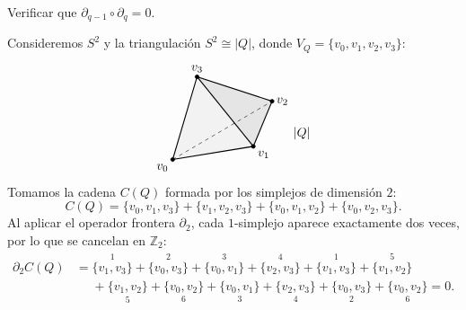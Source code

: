 \begin{ejercicio}
Verificar que ${\partial_{q-1} \circ \partial_q = 0}$.
\end{ejercicio}
\begin{ejemplo}
Consideremos $S^2$ y la triangulación $S^2 \cong |Q|$, donde $V_Q = \{v_0, v_1, v_2, v_3\}$:
\[
\begin{tikzpicture}[baseline=(current bounding box.center), scale=1.05]
    \coordinate (V0) at (0, 0);
    \coordinate (V1) at (2.15, 0.35);
    \coordinate (V2) at (2.65, 1.55);
    \coordinate (V3) at (0.65, 2.2);

    \fill[gray!10] (V0) -- (V1) -- (V3) -- cycle;
    \fill[gray!20] (V1) -- (V2) -- (V3) -- cycle;

    \draw[dashed, thin] (V0) -- (V2);

    \draw[thick] (V0) -- (V1) -- (V2) -- (V3) -- cycle;
    \draw[thick] (V1) -- (V3);

    \filldraw (V0) circle (1.5pt) node[below left] {$v_0$};
    \filldraw (V1) circle (1.5pt) node[below right] {$v_1$};
    \filldraw (V2) circle (1.5pt) node[right] {$v_2$};
    \filldraw (V3) circle (1.5pt) node[above] {$v_3$};

    \node[right] at (3.1, 0.7) {$|Q|$};
\end{tikzpicture}
\]
Tomamos la cadena $C(Q)$ formada por los simplejos de dimensión $2$:
\[
C(Q) = \{v_0, v_1, v_3\} + \{v_1, v_2, v_3\} + \{v_0, v_1, v_2\} + \{v_0, v_2, v_3\}.
\]
Al aplicar el operador frontera $\partial_2$, cada $1$-simplejo aparece exactamente dos veces, por lo que se cancelan en $\mathbb{Z}_2$:
\begin{align*}
\partial_2 C(Q) &= \overset{1}{\{v_1, v_3\}} + \overset{2}{\{v_0, v_3\}} + \overset{3}{\{v_0, v_1\}} + \overset{4}{\{v_2, v_3\}} + \overset{1}{\{v_1, v_3\}} + \overset{5}{\{v_1, v_2\}} \\[0.5ex]
&\phantom{=} + \underset{5}{\{v_1, v_2\}} + \underset{6}{\{v_0, v_2\}} + \underset{3}{\{v_0, v_1\}} + \underset{4}{\{v_2, v_3\}} + \underset{2}{\{v_0, v_3\}} + \underset{6}{\{v_0, v_2\}} = 0.
\end{align*}
\end{ejemplo}

